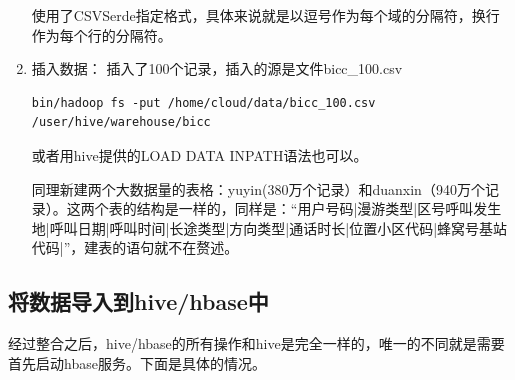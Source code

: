 \begin{enumerate}
使用了CSVSerde指定格式，具体来说就是以逗号作为每个域的分隔符，换行作为每个行的分隔符。

\item 插入数据：
插入了100个记录，插入的源是文件bicc\_100.csv
\begin{lstlisting}
bin/hadoop fs -put /home/cloud/data/bicc_100.csv /user/hive/warehouse/bicc
\end{lstlisting}
或者用hive提供的LOAD DATA INPATH语法也可以。


  同理新建两个大数据量的表格：yuyin(380万个记录）和duanxin（940万个记录）。这两个表的结构是一样的，同样是：“用户号码|漫游类型|区号呼叫发生地|呼叫日期|呼叫时间|长途类型|方向类型|通话时长|位置小区代码|蜂窝号基站代码|”，建表的语句就不在赘述。
\end{enumerate}

\subsection{将数据导入到hive/hbase中}
经过整合之后，hive/hbase的所有操作和hive是完全一样的，唯一的不同就是需要首先启动hbase服务。下面是具体的情况。
